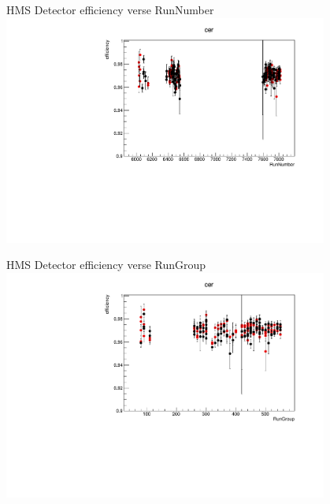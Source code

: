 \documentclass[aspectratio=169,xcolor=dvipsnames]{beamer}
\begin{document}
\begin{frame}{HMS Detector efficiency verse RunNumber}
  \includegraphics[width = 0.8\textwidth]{results/pid/HMS_cer_DE_RunNumber.pdf}
\end{frame}
\begin{frame}{HMS Detector efficiency verse RunGroup}
  \includegraphics[width = 0.8\textwidth]{results/pid/HMS_cer_DE_RunGroup.pdf}
\end{frame}
\end{document}
